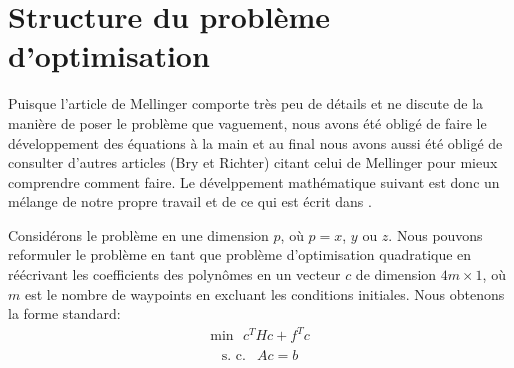 \section{Structure du problème d'optimisation}

Puisque l'article de Mellinger comporte très peu de détails et ne discute de la manière de poser le problème que vaguement, nous avons été obligé de faire le développement des équations à la main et au final nous avons aussi été obligé de consulter d'autres articles (Bry et Richter) citant celui de Mellinger pour mieux comprendre comment faire. Le dévelppement mathématique suivant est donc un mélange de notre propre travail et de ce qui est écrit dans \cite{Richter2016, bry2012control}.

Considérons le problème en une dimension $p$, où $p = x$, $y$ ou $z$. Nous pouvons reformuler le problème en tant que problème d'optimisation quadratique en réécrivant les coefficients des polynômes en un vecteur $c$ de dimension $4m \times 1$, où $m$ est le nombre de waypoints en excluant les conditions initiales. Nous obtenons la forme standard:
\begin{align}\label{eq:opt_quad}
\text{min}\ \ \ c^THc+f^Tc
\end{align}\begin{align*}
	\begin{array}{ll}
	\text{s. c.} & Ac = b
	\end{array}
\end{align*}

